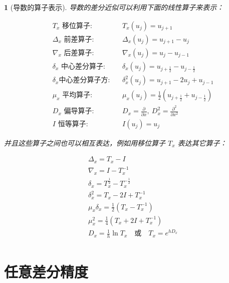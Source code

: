 \documentclass[zihao=5,UTF8]{report}
\theoremstyle{MyTheoremStyle} %
\theoremstyle{MySubsubsectionStyle} %
\newtheorem{definition}{}
\begin{document}
\begin{definition}[导数的算子表示]

导数的差分近似可以利用下面的线性算子来表示：

\begin{equation}
    \begin{aligned}
        &T_x\text{ 移位算子}:&& T_{x}(u_{j})=u_{j+1} \\
        &\Delta_x\text{ 前差算子}:&& \Delta_{x}(u_{j})=u_{j+1}-u_{j} \\
        &\nabla_x\text{ 后差算子}:&& \nabla_{x}(u_{j})=u_{j}-u_{j-1} \\
        &\delta_x\text{ 中心差分算子}:&& \delta_{x}(u_{j})=u_{j+\frac{1}{2}}-u_{j-\frac{1}{2}} \\
        &\delta_x\text{中心差分算子方}:&& \delta_{x}^2(u_{j})= u_{j+1}-2u_{j}+u_{j-1} \\
        &\mu_x\text{ 平均算子}:&& \mu_{x}(u_{j})=\frac{1}{2}(u_{j+\frac{1}{2}}+u_{j-\frac{1}{2}}) \\
        &D_x\text{ 偏导算子}:&& D_{x}=\frac{\partial}{\partial x},\ D_{x}^2=\frac{\partial^2}{\partial x^2} \\
        &I\text{ 恒等算子}:&& I(u_j)=u_j
        \end{aligned}
\end{equation}

并且这些算子之间也可以相互表达，例如用移位算子 $T_x$ 表达其它算子：

\begin{align*}
&\Delta_x = T_x - I \\ 
&\nabla_x = I - T_x^{-1} \\ 
&\delta_x = T_x^{\frac{1}{2}} -  T_x^{-\frac{1}{2}} \\ 
&\delta_x^2=T_x-2I+T_x^{-1}  \\ 
&\mu_{x}\delta_{x}=\frac{1}{2}(T_{x}-T_{x}^{-1}) \\ 
&\mu_{x}^{2}=\frac{1}{4}(T_{x}+2I+T_{x}^{-1})  \\ 
& D_x=\frac{1}{h}\ln T_x\quad\text{或}\quad T_x=e^{hD_x} \\ 
\end{align*}


\end{definition}



\section{任意差分精度}
\end{document}
